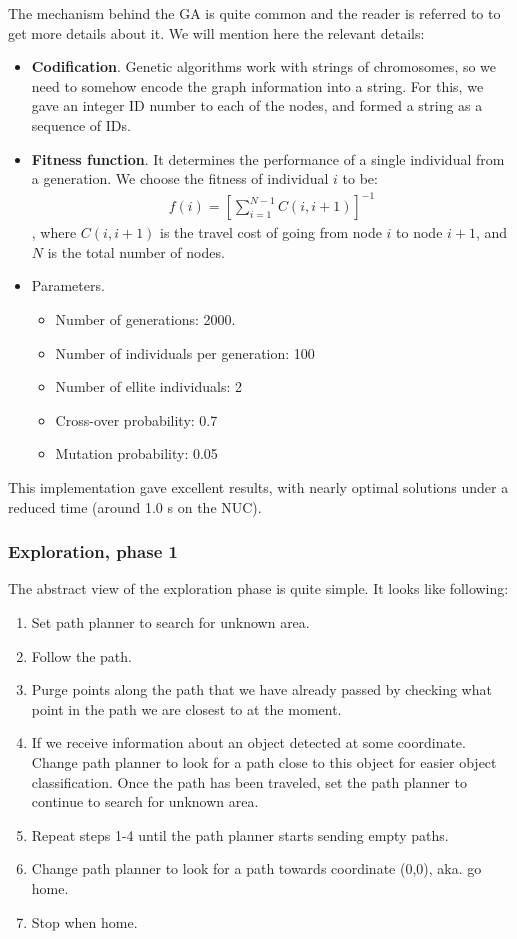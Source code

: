 The mechanism behind the GA is quite common and the reader is referred to \cite{genetic} to get more details about it. We will mention here the relevant details:
\begin{itemize}
\item \textbf{Codification}. Genetic algorithms work with strings of chromosomes, so we need to somehow encode the graph information into a string. For this, we gave an integer ID number to each of the nodes, and formed a string as a sequence of IDs.
\item \textbf{Fitness function}. It determines the performance of a single individual from a generation. We choose the fitness of individual $i$ to be:
\begin{align}
f(i) = \left[\sum_{i = 1}^{N-1} C(i,i+1)\right]^{-1}
\end{align}
, where $C(i, i+1)$ is the travel cost of going from node $i$ to node $i+1$, and $N$ is the total number of nodes.
\item Parameters. 
\begin{itemize}
\item Number of generations: 2000.
\item Number of individuals per generation: 100
\item Number of ellite individuals: 2
\item Cross-over probability: 0.7
\item Mutation probability: 0.05
\end{itemize}
\end{itemize}

This implementation gave excellent results, with nearly optimal solutions under a reduced time (around 1.0 s on the NUC). 
\subsubsection{Exploration, phase 1}

The abstract view of the exploration phase is quite simple. It looks like following:

\begin{enumerate}
\item Set path planner to search for unknown area.
\item Follow the path.
\item Purge points along the path that we have already passed by checking what point in the path we are closest to at the moment.
\item If we receive information about an object detected at some coordinate. Change path planner to look for a path close to this object for easier object classification. Once the path has been traveled, set the path planner to continue to search for unknown area.
\item Repeat steps 1-4 until the path planner starts sending empty paths. 
\item Change path planner to look for a path towards coordinate (0,0), aka. go home.
\item Stop when home.
\end{enumerate}

